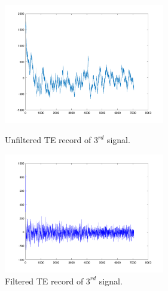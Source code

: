 \documentclass[a4paper,11pt]{article}
\begin{document}
\begin{figure}[ht!]
    \begin{minipage}{0.5\textwidth}
        \centering
        \includegraphics[width=70mm]{TE_sig3.png}
        \caption{Unfiltered TE record of $3^{rd}$ signal.}
    \end{minipage}\hfill
    \begin{minipage}{0.5\textwidth}
        \centering
        \includegraphics[width=70mm]{TE_sig3_filtered.png}
        \caption{Filtered TE record of $3^{rd}$ signal.}
    \end{minipage}\hfill
\end{figure}
\end{document}
